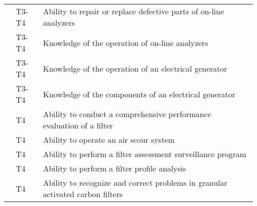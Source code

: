 \begin{table}[H]
\begin{tabular}{| m{1cm} | m{1cm} | m{12cm} |}
\multicolumn{1}{l|}{} & \multicolumn{1}{l|}{T3-T4} & Ability to repair or   replace defective parts of on-line analyzers                        \\ \cline{2-3} 
\multicolumn{1}{l|}{} & \multicolumn{1}{l|}{T3-T4} & Knowledge of the   operation of on-line analyzers                                          \\ \cline{2-3} 
\multicolumn{1}{l|}{} & \multicolumn{1}{l|}{T3-T4} & Knowledge of the   operation of an electrical generator                                    \\ \cline{2-3} 
\multicolumn{1}{l|}{} & \multicolumn{1}{l|}{T3-T4} & Knowledge of the   components of an electrical generator                                   \\ \cline{2-3} 
\multicolumn{1}{l|}{} & \multicolumn{1}{l|}{T4}    & Ability to conduct a   comprehensive performance evaluation of a filter                    \\ \cline{2-3} 
\multicolumn{1}{l|}{} & \multicolumn{1}{l|}{T4}    & Ability to operate an   air scour system                                                   \\ \cline{2-3} 
\multicolumn{1}{l|}{} & \multicolumn{1}{l|}{T4}    & Ability to perform a   filter assessment surveillance program                              \\ \cline{2-3} 
\multicolumn{1}{l|}{} & \multicolumn{1}{l|}{T4}    & Ability to perform a   filter profile analysis                                             \\ \cline{2-3} 
\multicolumn{1}{l|}{} & \multicolumn{1}{l|}{T4}    & Ability to recognize   and correct problems in granular activated carbon filters           \\ \cline{2-3} 
\end{tabular}
\end{table}
\newpage


